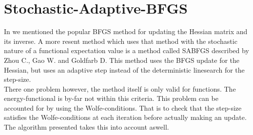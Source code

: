\section{Stochastic-Adaptive-BFGS\label{sec:stochastic_adaptive_bfgs}}
    In  we mentioned the popular BFGS method for updating the
    Hessian matrix and its inverse. A more resent method which uses that method
    with the stochastic nature of a functional expectation value is a method
    called SABFGS\cite{SABFGS} described by Zhou C., Gao W. and Goldfarb D.
    This method uses the BFGS update for the Hessian, but uses an adaptive step
    instead of the deterministic linesearch for the step-size. \\ 
    There one problem however, the method itself is only valid for
     functions. The energy-functional is by-far not
    within this criteria. This problem can be accounted for by using the
    Wolfe-conditions. That is to check that the step-size satisfies the
    Wolfe-conditions at each iteration before actually making an update. The
    algorithm presented takes this into account aswell.

